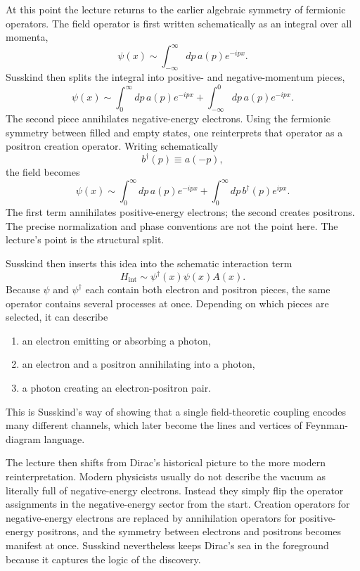 At this point the lecture returns to the earlier algebraic symmetry of fermionic operators. The field operator is first written schematically as an integral over all momenta,
\begin{equation}
\psi(x)\sim \int_{-\infty}^{\infty} dp\, a(p)e^{-ipx}.
\end{equation}
Susskind then splits the integral into positive- and negative-momentum pieces,
\begin{equation}
\psi(x)\sim
\int_{0}^{\infty} dp\, a(p)e^{-ipx}
+
\int_{-\infty}^{0} dp\, a(p)e^{-ipx}.
\end{equation}
The second piece annihilates negative-energy electrons. Using the fermionic symmetry between filled and empty states, one reinterprets that operator as a positron creation operator. Writing schematically
\begin{equation}
b^\dagger(p)\equiv a(-p),
\end{equation}
the field becomes
\begin{equation}
\psi(x)\sim
\int_0^\infty dp\, a(p)e^{-ipx}
+
\int_0^\infty dp\, b^\dagger(p)e^{ipx}.
\end{equation}
The first term annihilates positive-energy electrons; the second creates positrons. The precise normalization and phase conventions are not the point here. The lecture's point is the structural split.

Susskind then inserts this idea into the schematic interaction term
\begin{equation}
H_{\mathrm{int}}\sim \psi^\dagger(x)\psi(x)A(x).
\end{equation}
Because \(\psi\) and \(\psi^\dagger\) each contain both electron and positron pieces, the same operator contains several processes at once. Depending on which pieces are selected, it can describe
\begin{enumerate}
\item an electron emitting or absorbing a photon,
\item an electron and a positron annihilating into a photon,
\item a photon creating an electron-positron pair.
\end{enumerate}
This is Susskind's way of showing that a single field-theoretic coupling encodes many different channels, which later become the lines and vertices of Feynman-diagram language.

The lecture then shifts from Dirac's historical picture to the more modern reinterpretation. Modern physicists usually do not describe the vacuum as literally full of negative-energy electrons. Instead they simply flip the operator assignments in the negative-energy sector from the start. Creation operators for negative-energy electrons are replaced by annihilation operators for positive-energy positrons, and the symmetry between electrons and positrons becomes manifest at once. Susskind nevertheless keeps Dirac's sea in the foreground because it captures the logic of the discovery.

